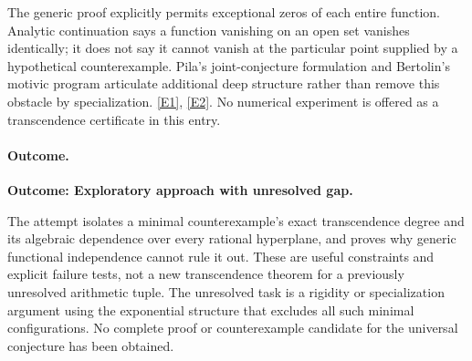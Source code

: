 \documentclass[11pt,a4paper]{article}
\newcommand{\eref}[2]{\hyperlink{extra:#1:#2}{[E#2]}}
\numberwithin{equation}{section}
\begin{document}
The generic proof explicitly permits exceptional zeros of each entire
function. Analytic continuation says a function vanishing on an open set
vanishes identically; it does not say it cannot vanish at the particular
point supplied by a hypothetical counterexample. Pila's joint-conjecture
formulation and Bertolin's motivic program articulate additional deep
structure rather than remove this obstacle by specialization.
\eref{3367}{1}, \eref{3367}{2}. No numerical experiment is offered as a
transcendence certificate in this entry.

\paragraph{Outcome.}
\textbf{Outcome: Exploratory approach with unresolved gap.}

The attempt isolates a minimal counterexample's exact transcendence degree
and its algebraic dependence over every rational hyperplane, and proves
why generic functional independence cannot rule it out. These are useful
constraints and explicit failure tests, not a new transcendence theorem
for a previously unresolved arithmetic tuple. The unresolved task is a
rigidity or specialization argument using the exponential structure that
excludes all such minimal configurations. No complete proof or
counterexample candidate for the universal conjecture has been obtained.

\end{document}
